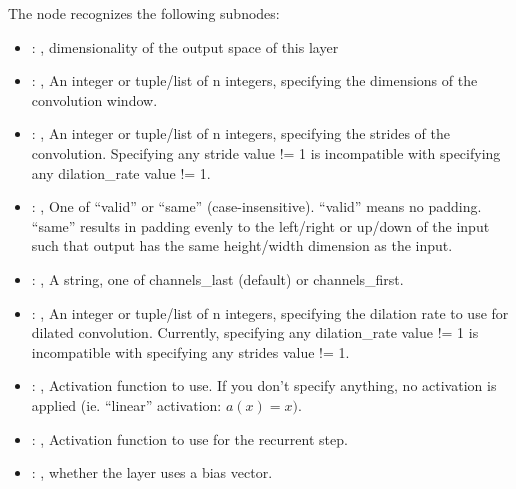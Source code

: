 \begin{itemize}
      The  node recognizes the following subnodes:
      \begin{itemize}
        \item {}: , 
          dimensionality of the output space of this layer

        \item {}: , 
          An integer or tuple/list of n integers, specifying the dimensions of the convolution
          window.

        \item {}: , 
          An integer or tuple/list of n integers, specifying the strides of the convolution.
          Specifying any         stride value != 1 is incompatible with specifying any
          dilation\_rate value != 1.

        \item {}: , 
          One of ``valid'' or ``same'' (case-insensitive). ``valid'' means no padding. ``same''
          results in padding        evenly to the left/right or up/down of the input such that
          output has the same height/width dimension as        the input.

        \item {}: , 
          A string, one of channels\_last (default) or channels\_first.

        \item {}: , 
          An integer or tuple/list of n integers, specifying the dilation rate to use for dilated
          convolution.         Currently, specifying any dilation\_rate value != 1 is incompatible
          with specifying any strides value != 1.

        \item {}: , 
          Activation function to use. If you don't specify anything, no activation is applied (ie.
          ``linear''         activation: $a(x) = x)$.

        \item {}: , 
          Activation function to use for the recurrent step.

        \item {}: , 
          whether the layer uses a bias vector.


\end{itemize}
\end{itemize}
